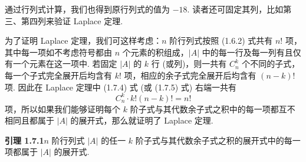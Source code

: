 \documentclass[UTF8,12pt,a4paper,fontset=fandol]{ctexart}
\begin{document}
通过行列式计算，我们也得到原行列式的值为 $-18$. 读者还可固定其列，比如第三、第四列来验证 Laplace 定理.

为了证明 Laplace 定理，我们可这样考虑：$n$ 阶行列式按照 (1.6.2) 式共有 $n!$ 项，其中每一项如不考虑符号都由 $n$ 个元素的积组成，$|A|$ 中的每一行及每一列有且仅有一个元素在这一项中. 若固定 $|A|$ 的 $k$ 行 (或列)，则一共有 $C_n^k$ 个不同的子式，每一个子式完全展开后均含有 $k!$ 项，相应的余子式完全展开后均含有 $(n-k)!$ 项. 因此在 Laplace 定理中 (1.7.4) 式 (或 (1.7.5) 式) 右端一共有
\[
C_n^k\cdot k!(n-k)!=n!
\]
项，所以如果我们能够证明每个 $k$ 阶子式与其代数余子式之积中的每一项都互不相同且都属于 $|A|$ 的展开式，那么就证明了 Laplace 定理.

\noindent\textbf{引理 1.7.1}\quad $n$ 阶行列式 $|A|$ 的任一 $k$ 阶子式与其代数余子式之积的展开式中的每一项都属于 $|A|$ 的展开式.
\end{document}
